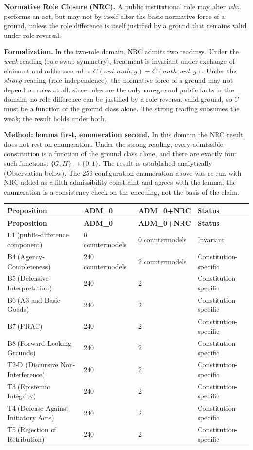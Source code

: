 \documentclass[11pt]{article}
\def\ensuremath#1{#1}%
\def\mathrm#1{#1}%
\newcommand{\ADM}{\texorpdfstring{\ensuremath{\mathrm{ADM}_0}}{ADM0}}
\begin{document}
\begin{paperbox}
\textbf{Normative Role Closure (NRC).} A public institutional role may alter \emph{who} performs an act, but may not by itself alter the basic normative force of a ground, unless the role difference is itself justified by a ground that remains valid under role reversal.
\end{paperbox}

\textbf{Formalization.} In the two-role domain, NRC admits two readings. Under the \emph{weak} reading (role-swap symmetry), treatment is invariant under exchange of claimant and addressee roles: $C(\mathrm{ord},\mathrm{auth},g) = C(\mathrm{auth},\mathrm{ord},g)$. Under the \emph{strong} reading (role independence), the normative force of a ground may not depend on roles at all: since roles are the only non-ground public facts in the domain, no role difference can be justified by a role-reversal-valid ground, so $C$ must be a function of the ground class alone. The strong reading subsumes the weak; the result holds under both.

\textbf{Method: lemma first, enumeration second.} In this domain the NRC result does not rest on enumeration. Under the strong reading, every admissible constitution is a function of the ground class alone, and there are exactly four such functions: $\{G, H\} \to \{0, 1\}$. The result is established analytically (Observation below). The 256-configuration enumeration above was re-run with NRC added as a fifth admissibility constraint and agrees with the lemma; the enumeration is a consistency check on the encoding, not the basis of the claim.

\begin{longtable}{@{}L{4.6cm} L{2.5cm} L{2.6cm} L{4.9cm}@{}}
\toprule
\textbf{Proposition} & \textbf{\ADM{}} & \textbf{\ADM{}+NRC} & \textbf{Status} \\
\midrule
\endfirsthead
\toprule
\textbf{Proposition} & \textbf{\ADM{}} & \textbf{\ADM{}+NRC} & \textbf{Status} \\
\midrule
\endhead
\bottomrule
\endfoot
L1 (public-difference component) & 0 countermodels & 0 countermodels & Invariant \\
B4 (Agency-Completeness) & 240 countermodels & 2 countermodels & Constitution-specific \\
B5 (Defensive Interpretation) & 240 & 2 & Constitution-specific \\
B6 (A3 and Basic Goods) & 240 & 2 & Constitution-specific \\
B7 (PRAC) & 240 & 2 & Constitution-specific \\
B8 (Forward-Looking Grounds) & 240 & 2 & Constitution-specific \\
T2-D (Discursive Non-Interference) & 240 & 2 & Constitution-specific \\
T3 (Epistemic Integrity) & 240 & 2 & Constitution-specific \\
T4 (Defense Against Initiatory Acts) & 240 & 2 & Constitution-specific \\
T5 (Rejection of Retribution) & 240 & 2 & Constitution-specific \\
\end{longtable}
\end{document}
